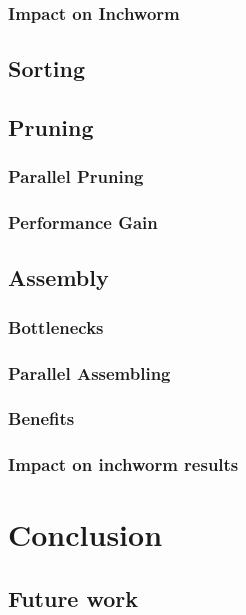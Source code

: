 \documentclass[plainarticle,zihtitle,english,final,hyperref,utf8]{zihpub}
\begin{document}
\subsubsection{Impact on Inchworm}
\subsection{Sorting}
\subsection{Pruning}
\subsubsection{Parallel Pruning}
\subsubsection{Performance Gain}
\subsection{Assembly}
\subsubsection{Bottlenecks}
\subsubsection{Parallel Assembling}
\subsubsection{Benefits}
\subsubsection{Impact on inchworm results}

\section{Conclusion}
\subsection{Future work}
\end{document}
